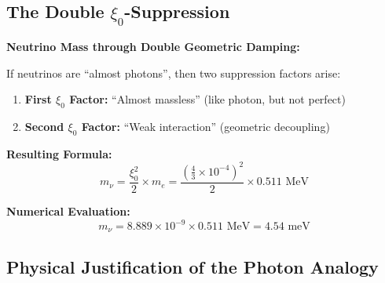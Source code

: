 	\subsection{The Double $\xi_0$-Suppression}
	
	\begin{keyresult}
		\textbf{Neutrino Mass through Double Geometric Damping:}
		
		If neutrinos are ``almost photons'', then two suppression factors arise:
		
		\begin{enumerate}
			\item \textbf{First $\xi_0$ Factor:} ``Almost massless'' (like photon, but not perfect)
			\item \textbf{Second $\xi_0$ Factor:} ``Weak interaction'' (geometric decoupling)
		\end{enumerate}
		
		\textbf{Resulting Formula:}
		\begin{equation}
			\boxed{m_\nu = \frac{\xi_0^2}{2} \times m_e = \frac{(\frac{4}{3} \times 10^{-4})^2}{2} \times 0.511 \text{ MeV}}
		\end{equation}
		
		\textbf{Numerical Evaluation:}
		\begin{equation}
			m_\nu = 8.889 \times 10^{-9} \times 0.511 \text{ MeV} = 4.54 \text{ meV}
		\end{equation}
	\end{keyresult}
	
	\subsection{Physical Justification of the Photon Analogy}
	
